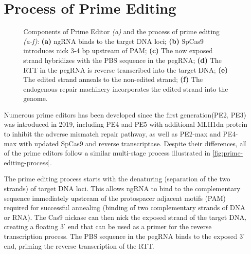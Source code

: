 \section{Process of Prime Editing}

\label{sec:prime-editing-process}

\begin{figure}[ht]
    \centering
    \caption[Components of Prime Editor \textit{(a)} and the process of prime editing \textit{(a-f)}]{Components of Prime Editor \textit{(a)} and the process of prime editing \textit{(a-f)}: \textbf{(a)} ngRNA binds to the target DNA loci; \textbf{(b)} SpCas9 introduces nick 3-4 bp upstream of PAM; \textbf{(c)} The now exposed strand hybridizes with the PBS sequence in the pegRNA; \textbf{(d)} The RTT in the pegRNA is reverse transcribed into the target DNA; \textbf{(e)} The edited strand anneals to the non-edited strand; \textbf{(f)} The endogenous repair machinery incorporates the edited strand into the genome.}
    \label{fig:prime-editing-process}
\end{figure}

Numerous prime editors has been developed since the first generation(PE2, PE3) was introduced in 2019, including PE4 and PE5 with additional MLH1dn protein to inhibit the adverse mismatch repair pathway, as well as PE2-max and PE4-max with updated SpCas9 and reverse transcriptase\cite{liuPrimeEditingPrecise2023}. Despite their differences, all of the prime editors follow a similar multi-stage process illustrated in \autoref{fig:prime-editing-process}. 

The prime editing process starts with the denaturing (separation of the two strands) of target DNA loci. This allows ngRNA to bind to the complementary sequence immediately upstream of the protospacer adjacent motifs (PAM) required for successful annealing (binding of two complementary strands of DNA or RNA). The Cas9 nickase can then nick the exposed strand of the target DNA, creating a floating 3' end that can be used as a primer for the reverse transcription process. The PBS sequence in the pegRNA binds to the exposed 3' end, priming the reverse transcription of the RTT. 

